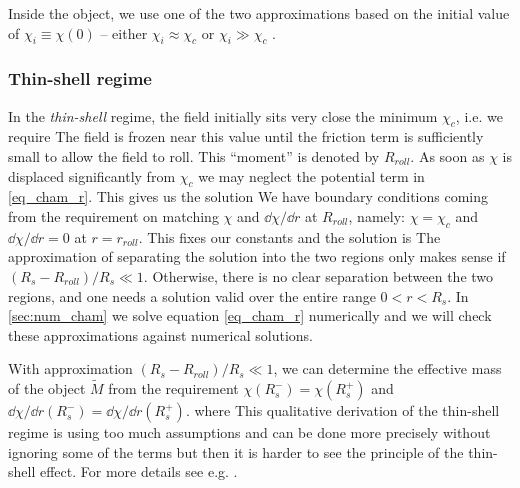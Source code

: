 Inside the object, we use one of the two approximations based on the initial value of $\chi_i\equiv\chi(0)$ -- either $\chi_i\approx\chi_c$ or $\chi_i\gg\chi_c$ .
\subsubsection{Thin-shell regime}
In the \textit{thin-shell} regime, the field initially sits very close the minimum $\chi_c$, i.e. we require
The field is frozen near this value until the friction term is sufficiently small to allow the field to roll. This ``moment'' is denoted by $R_{roll}$. As soon as $\chi$ is displaced significantly from $\chi_c$ we may neglect the potential term in \eqref{eq_cham_r}. This gives us the solution
We have boundary conditions coming from the requirement on matching $\chi$ and  $\dd\chi/\dd r$ at $R_{roll}$, namely: $\chi=\chi_c$ and $\dd\chi/\dd r=0$ at $r=r_{roll}$. This fixes our constants and the solution is
The approximation of separating the solution into the two regions only makes sense if $(R_s-R_{roll})/R_s\ll1$. Otherwise, there is no clear separation between the two regions, and one needs a solution valid over the entire range $0<r<R_s$. In \autoref{sec:num_cham} we solve equation \eqref{eq_cham_r} numerically and we will check these approximations against numerical solutions.

With approximation $(R_s-R_{roll})/R_s\ll1$, we can determine the effective mass of the object $\tilde{M}$ from the requirement $\chi(R_s^-)=\chi(R_s^+)$ and $\dd\chi/\dd r(R_s^-)=\dd\chi/\dd r(R_s^+)$.
where
This qualitative derivation of the thin-shell regime is using too much assumptions and can be done more precisely without ignoring some of the terms but then it is harder to see the principle of the thin-shell effect. For more details see e.g. \textcite{Tamaki:2008mf,2007PhRvD..75f3501M,Waterhouse:2006wv}.
